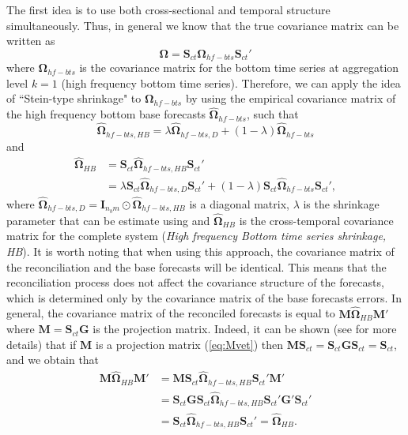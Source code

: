 \documentclass[a4paper,11pt]{article}
\newcommand{\Gvet}{\bm{G}}
\newcommand{\Ivet}{\bm{I}}
\newcommand{\Mvet}{\bm{M}}
\newcommand{\Svet}{\bm{S}}
\newcommand{\Omegavet}{\bm{\Omega}}
\theoremstyle{definition}
\begin{document}
The first idea is to use both cross-sectional and temporal structure simultaneously. Thus, in general we know that the true covariance matrix can be written as
\begin{equation}
	\label{eq:OmSct}
\Omegavet= \Svet_{ct}\Omegavet_{hf-bts}\Svet_{ct}'
\end{equation}
where $\Omegavet_{hf-bts}$ is the covariance matrix for the bottom time series at aggregation level $k = 1$ (high frequency bottom time series).
Therefore, we can apply the idea of “Stein-type shrinkage" to $\Omegavet_{hf-bts}$ by using the empirical covariance matrix of the high frequency bottom base forecasts $\widehat{\Omegavet}_{hf-bts}$, such that
$$
\widehat{\Omegavet}_{hf-bts, HB} = \lambda \widehat{\Omegavet}_{hf-bts, D} + (1-\lambda) \widehat{\Omegavet}_{hf-bts}
$$
and
\begin{align*}
	\widehat{\Omegavet}_{HB} & = \Svet_{ct}\widehat{\Omegavet}_{hf-bts, HB}\Svet_{ct}'\\
	& = \lambda \Svet_{ct}\widehat{\Omegavet}_{hf-bts, D}\Svet_{ct}'+ (1-\lambda) \Svet_{ct}\widehat{\Omegavet}_{hf-bts}\Svet_{ct}',
\end{align*}
where $\widehat{\Omegavet}_{hf-bts, D} = \Ivet_{n_b m}\odot\widehat{\Omegavet}_{hf-bts, HB}$ is a diagonal matrix, $\lambda$ is the shrinkage parameter that can be estimate using \cite{schafer2005} and $\widehat{\Omegavet}_{HB}$ is the cross-temporal covariance matrix for the complete system (\textit{High frequency Bottom time series shrinkage, HB}).
It is worth noting that when using this approach, the covariance matrix of the reconciliation and the base forecasts will be identical. This means that the reconciliation process does not affect the covariance structure of the forecasts, which is determined only by the covariance matrix of the base forecasts errors. In general, the covariance matrix of the reconciled forecasts is equal to $\Mvet \widehat{\Omegavet}_{HB} \Mvet'$ where $\Mvet = \Svet_{ct}\Gvet$ is the projection matrix. Indeed, it can be shown (see \citealp{panagiotelis2021} for more details) that if $\Mvet$ is a projection matrix (\ref{eq:Mvet}) then $\Mvet\Svet_{ct} = \Svet_{ct}\Gvet\Svet_{ct} = \Svet_{ct}$, and we obtain that
$$
\begin{aligned}
	\Mvet \widehat{\Omegavet}_{HB} \Mvet' & = \Mvet\Svet_{ct}\widehat{\Omegavet}_{hf-bts, HB}\Svet_{ct}'\Mvet' \\
	& = \Svet_{ct}\Gvet\Svet_{ct}\widehat{\Omegavet}_{hf-bts, HB}\Svet_{ct}'\Gvet'\Svet_{ct}' \\
	& = \Svet_{ct}\widehat{\Omegavet}_{hf-bts, HB}\Svet_{ct}' = \widehat{\Omegavet}_{HB}.
\end{aligned}
$$
\end{document}
